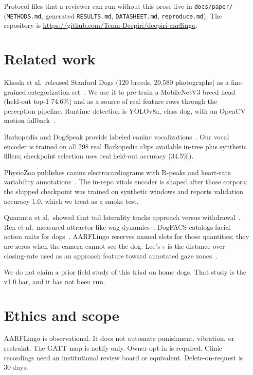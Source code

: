 \documentclass[11pt]{article}
\begin{document}
Protocol files that a reviewer can run without this prose live in
\texttt{docs/paper/} (\texttt{METHODS.md}, generated \texttt{RESULTS.md},
\texttt{DATASHEET.md}, \texttt{reproduce.md}).
The repository is
\url{https://github.com/Team-Deepiri/deepiri-aarflingo}.

\section{Related work}

Khosla et al.\ released Stanford Dogs (120 breeds, 20{,}580 photographs) as a fine-grained
categorization set~\citep{khosla2011stanford}.
We use it to pre-train a MobileNetV3 breed head (held-out top-1 74.6\%) and as a source of real
feature rows through the perception pipeline.
Runtime detection is YOLOv8n, class dog, with an OpenCV motion fallback~\citep{yolov8}.

Barkopedia and DogSpeak provide labeled canine vocalizations~\citep{barkopedia,dogspeak}.
Our vocal encoder is trained on all 298 real Barkopedia clips available in-tree plus synthetic fillers;
checkpoint selection uses real held-out accuracy (34.5\%).

PhysioZoo publishes canine electrocardiograms with R-peaks and heart-rate variability
annotations~\citep{physiozoo}.
The in-repo vitals encoder is shaped after those corpora; the shipped checkpoint was trained on
synthetic windows and reports validation accuracy 1.0, which we treat as a smoke test.

Quaranta et al.\ showed that tail laterality tracks approach versus withdrawal~\citep{quaranta2007tail}.
Ren et al.\ measured attractor-like wag dynamics~\citep{ren2022tail}.
DogFACS catalogs facial action units for dogs~\citep{waller2013dogfacs}.
AARFLingo reserves named slots for those quantities; they are zeros when the camera cannot see the dog.
Lee's $\tau$ is the distance-over-closing-rate used as an approach feature toward annotated gaze
zones~\citep{lee1976tau}.

We do not claim a prior field study of this triad on home dogs.
That study is the v1.0 bar, and it has not been run.

\section{Ethics and scope}

AARFLingo is observational.
It does not automate punishment, vibration, or restraint.
The GATT map is notify-only.
Owner opt-in is required.
Clinic recordings need an institutional review board or equivalent.
Delete-on-request is 30 days.
\end{document}
